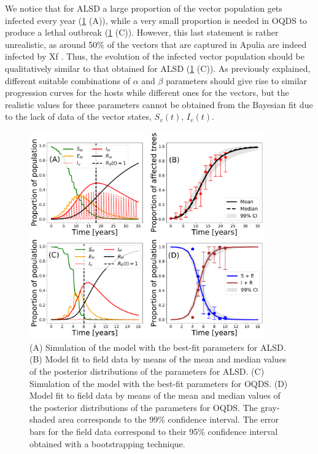 We notice that for ALSD a large proportion of the vector population gets
infected every year (\cref{fig:best_fit_model} (A)), while a very small
proportion is needed in OQDS to produce a lethal outbreak
(\cref{fig:best_fit_model} (C)). However, this last statement is rather
unrealistic, as around 50\% of the vectors that are captured in Apulia are
indeed infected by Xf \cite{Cavalieri2019,cornara2017transmission}. Thus, the
evolution of the infected vector population should be qualitatively similar to
that obtained for ALSD (\cref{fig:best_fit_model} (C)). As previously
explained,
different suitable combinations of $\alpha$ and $\beta$ parameters should give
rise to similar progression curves for the hosts while different ones for the
vectors, but the realistic values for these parameters cannot be obtained from
the Bayesian fit due to the lack of data of the vector states, $S_v(t)$,
$I_v(t)$.

\begin{figure}[H]
    \centering
    \includegraphics[width=0.9\textwidth]{Figures/BayesianInference.pdf}
    \caption[Best-fit model to the field data for ALSD and OQDS]{(A) Simulation
        of the model with the best-fit parameters for
        ALSD. (B) Model fit to field data by means of the mean and median
        values of the
        posterior distributions of the parameters for ALSD. (C) Simulation of
        the model
        with the best-fit parameters for OQDS. (D) Model fit to field data by
        means of
        the mean and median values of the posterior distributions of the
        parameters for
        OQDS. The gray-shaded area corresponds to the 99\% confidence interval.
        The
        error bars for the field data correspond to their 95\% confidence
        interval
        obtained with a bootstrapping technique.}
    \label{fig:best_fit_model}
\end{figure}

